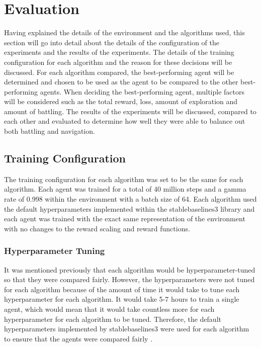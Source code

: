 \section{Evaluation}

Having explained the details of the environment and the algorithms used, this section will go into detail about the details of the configuration of the experiments and the results of the experiments. The details of the training configuration for each algorithm and the reason for these decisions will be discussed. For each algorithm compared, the best-performing agent will be determined and chosen to be used as the agent to be compared to the other best-performing agents. When deciding the best-performing agent, multiple factors will be considered such as the total reward, loss, amount of exploration and amount of battling. The results of the experiments will be discussed, compared to each other and evaluated to determine how well they were able to balance out both battling and navigation.

\subsection{Training Configuration}

The training configuration for each algorithm was set to be the same for each algorithm. Each agent was trained for a total of 40 million steps and a gamma rate of 0.998 within the environment with a batch size of 64. Each algorithm used the default hyperparameters implemented within the stablebaselines3 library and each agent was trained with the exact same representation of the environment with no changes to the reward scaling and reward functions. 

\subsubsection{Hyperparameter Tuning}

It was mentioned previously that each algorithm would be hyperparameter-tuned so that they were compared fairly. However, the hyperparameters were not tuned for each algorithm because of the amount of time it would take to tune each hyperparameter for each algorithm. It would take 5-7 hours to train a single agent, which would mean that it would take countless more for each hyperparameter for each algorithm to be tuned. Therefore, the default hyperparameters implemented by stablebaselines3 were used for each algorithm to ensure that the agents were compared fairly \cite{stablebaselines3}.

